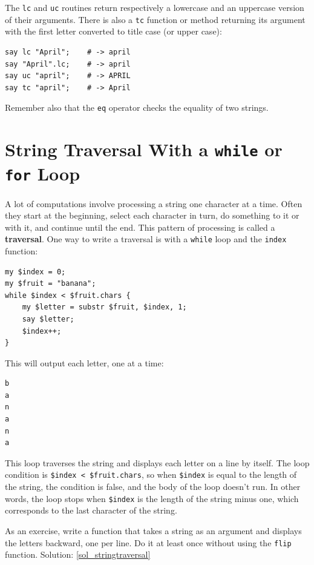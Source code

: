 The {\tt lc} and {\tt uc} routines return respectively a 
lowercase and an uppercase version of their arguments. 
There is also a {\tt tc} function or method returning its 
argument with the first letter converted to title case (or 
upper case):

\begin{verbatim}
say lc "April";    # -> april
say "April".lc;    # -> april
say uc "april";    # -> APRIL
say tc "april";    # -> April
\end{verbatim}

Remember also that the {\tt eq} operator checks the equality 
of two strings. 

\section{String Traversal With a {\tt while} or {\tt for} Loop}
\label{stringtraversal}

A lot of computations involve processing a string one 
character at a time.  Often they start at the beginning, 
select each character in turn, do something to it or with 
it, and continue until the end.  This pattern of
processing is called a {\bf traversal}.  One way to write
a traversal is with a {\tt while} loop and the 
{\tt index} function:

\begin{verbatim}
my $index = 0;
my $fruit = "banana";
while $index < $fruit.chars { 
    my $letter = substr $fruit, $index, 1; 
    say $letter; 
    $index++;
}
\end{verbatim}
%

This will output each letter, one at a time:
\begin{verbatim}
b
a
n
a
n
a
\end{verbatim}
%
This loop traverses the string and displays each letter on 
a line by itself.  The loop condition is 
{\tt \$index < \$fruit.chars}, so when {\tt \$index} is equal 
to the length of the string, the condition is false, and 
the body of the loop doesn't run. In other words, the loop 
stops when {\tt \$index} is the length of the string minus 
one, which corresponds to the last character of the string.

As an exercise, write a function that takes a string as 
an argument and displays the letters backward, one 
per line. Do it at least once without using the 
{\tt flip} function. Solution: \ref{sol_stringtraversal}


